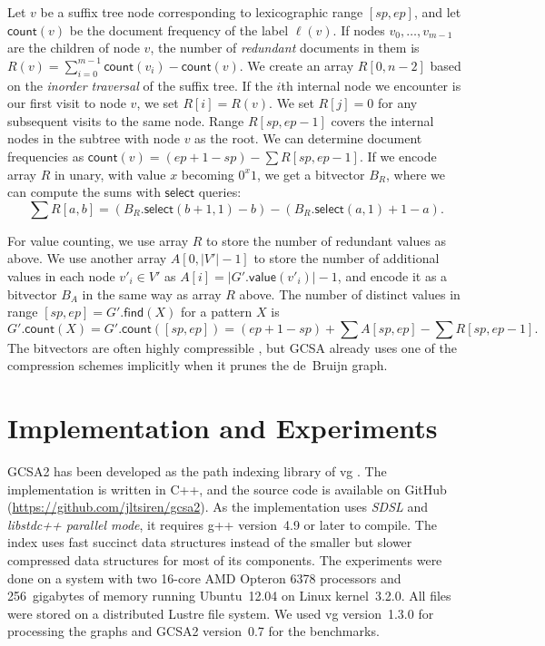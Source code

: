 \documentclass[a4paper,UKenglish]{lipics-v2016}
\newcommand{\abs}[1]{\ensuremath{\lvert #1 \rvert}}
\newcommand{\select}{\ensuremath{\mathsf{select}}}
\newcommand{\find}{\ensuremath{\mathsf{find}}}
\newcommand{\countq}{\ensuremath{\mathsf{count}}}
\newcommand{\gvalue}{\ensuremath{\mathsf{value}}}
\begin{document}
Let $v$ be a suffix tree node corresponding to lexicographic range $[sp, ep]$, and let $\countq(v)$ be the document frequency of the label $\ell(v)$. If nodes $v_{0}, \dotsc, v_{m-1}$ are the children of node $v$, the number of \emph{redundant} documents in them is $R(v) = \sum_{i=0}^{m-1} \countq(v_{i}) - \countq(v)$. We create an array $R[0, n-2]$ based on the \emph{inorder traversal} of the suffix tree. If the $i$th internal node we encounter is our first visit to node $v$, we set $R[i] = R(v)$. We set $R[j] = 0$ for any subsequent visits to the same node. Range $R[sp, ep-1]$ covers the internal nodes in the subtree with node $v$ as the root. We can determine document frequencies as $\countq(v) = (ep+1-sp) - \sum R[sp, ep-1]$. If we encode array $R$ in unary, with value $x$ becoming $0^{x} 1$, we get a bitvector $B_{R}$, where we can compute the sums with $\select$ queries:
$$
\sum R[a, b] = (B_{R}.\select(b+1, 1) - b) - (B_{R}.\select(a, 1) + 1 - a).
$$

For value counting, we use array $R$ to store the number of redundant values as above. We use another array $A[0, \abs{V'}-1]$ to store the number of additional values in each node $v'_{i} \in V'$ as $A[i] = \abs{G'.\gvalue(v'_{i})}-1$, and encode it as a bitvector $B_{A}$ in the same way as array $R$ above. The number of distinct values in range $[sp,ep] = G'.\find(X)$ for a pattern $X$ is
$$
G'.\countq(X) = G'.\countq([sp, ep]) = (ep+1-sp) + \sum A[sp, ep] - \sum R[sp, ep-1].
$$
The bitvectors are often highly compressible \cite{Gagie2015}, but GCSA already uses one of the compression schemes implicitly when it prunes the de~Bruijn graph.


\section{Implementation and Experiments}

GCSA2 has been developed as the path indexing library of vg \cite{Garrison2014-2016}. The implementation is written in C++, and the source code is available on GitHub (\url{https://github.com/jltsiren/gcsa2}). As the implementation uses \emph{SDSL} \cite{Gog2014b} and \emph{libstdc++ parallel mode}, it requires g++ version~4.9 or later to compile. The index uses fast succinct data structures instead of the smaller but slower compressed data structures for most of its components. The experiments were done on a system with two 16\nobreakdash-core AMD Opteron 6378 processors and 256~gigabytes of memory running Ubuntu~12.04 on Linux kernel~3.2.0. All files were stored on a distributed Lustre file system. We used vg version~1.3.0 for processing the graphs and GCSA2 version~0.7 for the benchmarks.
\end{document}
